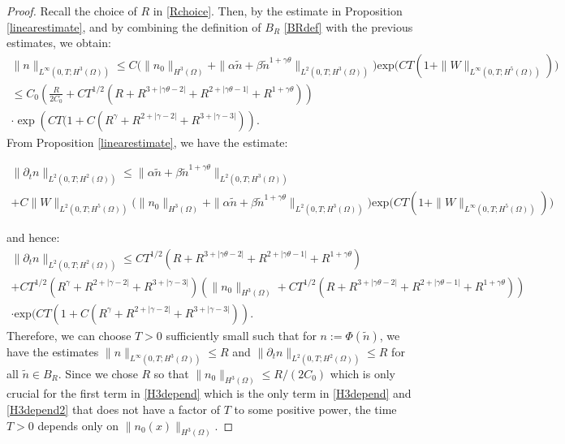 \documentclass[12pt]{article}
\theoremstyle{plain}
\begin{document}
\begin{proof}
Recall the choice of $R$ in \eqref{Rchoice}. Then, by the estimate in Proposition \ref{linearestimate}, and by combining the definition of $B_{R}$ \eqref{BRdef} with the previous estimates, we obtain:
\begin{multline}\label{H3depend}
\|n\|_{L^{\infty}(0, T; H^{3}(\Omega))} \le C\Big(\|n_{0}\|_{H^{3}(\Omega)} + \|\alpha \tilde{n} + \beta \tilde{n}^{1 + \gamma \theta}\|_{L^{2}(0, T; H^{3}(\Omega))}\Big) \text{exp}\Big(CT(1 + \|W\|_{L^{\infty}(0, T; H^{5}(\Omega))})\Big) \\
\le C_{0}\left(\frac{R}{2C_{0}} + CT^{1/2}\left(R + R^{3 + |\gamma \theta - 2|} + R^{2 + |\gamma \theta - 1|} + R^{1 + \gamma \theta}\right) \right) \\
\cdot \exp\left(CT(1 + C(R^{\gamma} + R^{2 + |\gamma - 2|} + R^{3 + |\gamma - 3|})\right).
\end{multline}
From Proposition \ref{linearestimate}, we have the estimate:
\begin{small}
\begin{multline*}
\|\partial_{t}n\|_{L^{2}(0, T; H^{2}(\Omega))} \le \|\alpha \tilde{n} + \beta \tilde{n}^{1 + \gamma \theta}\|_{L^{2}(0, T; H^{3}(\Omega))} \\
+ C\|W\|_{L^{2}(0, T; H^{5}(\Omega))} \Big(\|n_{0}\|_{H^{3}(\Omega)} + \|\alpha \tilde{n} + \beta \tilde{n}^{1 + \gamma \theta}\|_{L^{2}(0, T; H^{3}(\Omega))} \Big) \text{exp}\Big(CT(1 + \|W\|_{L^{\infty}(0, T; H^{5}(\Omega))})\Big)
\end{multline*}
\end{small}
and hence:
\begin{multline}\label{H3depend2}
\|\partial_{t}n\|_{L^{2}(0, T; H^{2}(\Omega))} \le CT^{1/2}\left(R + R^{3 + |\gamma \theta - 2|} + R^{2 + |\gamma \theta - 1|} + R^{1 + \gamma \theta}\right) \\
+ CT^{1/2}(R^{\gamma} + R^{2 + |\gamma - 2|} + R^{3 + |\gamma - 3|}) \left(\|n_0\|_{H^{3}(\Omega)} + CT^{1/2}\left(R + R^{3 + |\gamma \theta - 2|} + R^{2 + |\gamma \theta - 1|} + R^{1 + \gamma \theta}\right)\right) \\
\cdot \text{exp}(CT(1 + C(R^{\gamma} + R^{2 + |\gamma - 2|} + R^{3 + |\gamma - 3|})).
\end{multline}
Therefore, we can choose $T > 0$ sufficiently small such that for $n := \Phi(\tilde{n})$, we have the estimates $\|n\|_{L^{\infty}(0, T; H^{3}(\Omega))} \le R$ and $\|\partial_{t}n\|_{L^{2}(0, T; H^{2}(\Omega))} \le R$ for all $\tilde{n} \in B_{R}$. Since we chose $R$ so that $\|n_{0}\|_{H^{3}(\Omega)} \le R/(2C_0)$ which is only crucial for the first term in \eqref{H3depend} which is the only term in \eqref{H3depend} and \eqref{H3depend2} that does not have a factor of $T$ to some positive power, the time $T > 0$ depends only on $\|n_{0}(x)\|_{H^{3}(\Omega)}$.
\end{proof}
\end{document}
